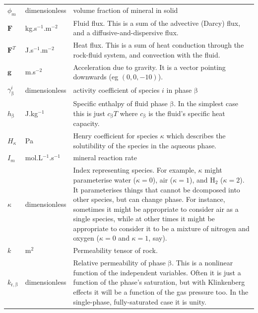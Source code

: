 \documentclass[12pt]{report}
\def\species{\kappa}
\def\phase{\mathrm{\beta}}
\def\flux{\mathbf{F}}
\begin{document}
\begin{longtable}{llp{10cm}}
$\phi_{m}$ & dimensionless & volume fraction of mineral in solid \\

$\flux$ & kg.s$^{-1}$.m$^{-2}$ & Fluid flux.  This is a sum of
the advective (Darcy) flux, and a diffusive-and-dispersive flux. \\

$\flux^{T}$ & J.s$^{-1}$.m$^{-2}$ & Heat flux.  This is a sum of heat
conduction through the rock-fluid system, and convection with the
fluid. \\

${\mathbf g}$ & m.s$^{-2}$ & Acceleration due to gravity.  It is a
vector pointing downwards (eg $(0, 0, -10)$). \\

$\gamma_{\phase}^{i}$ & dimensionless & activity coefficient of
species $i$ in phase $\phase$ \\

$h_{\phase}$ & J.kg$^{-1}$ & Specific enthalpy of fluid phase
$\phase$. In the simplest case this is just $c_{\phase}T$ where
$c_{\phase}$ is the fluid's specific heat capacity.\\

$H_{\species}$ & Pa & Henry coefficient for species $\species$ which
describes the solutibility of the species in the aqueous phase. \\

$I_{m}$ & mol.L$^{-1}$.s$^{-1}$ & mineral reaction rate \\

$\species$ & dimensionless & Index representing species.  For example, $\species$
might parameterise water ($\species=0$), air ($\species=1$), and H$_{2}$ ($\species=2$).  It
parameterises things that cannot be dcomposed into other species, but
can change phase.  For instance, sometimes it might be appropriate to
consider air as a single species, while at other times it might be
appropriate to consider it to be a mixture of nitrogen and oxygen
($\species=0$ and $\species=1$, say). \\

$k$ & m$^{2}$ & Permeability tensor of rock. \\

$k_{\mathrm{r,}\phase}$ & dimensionless & Relative permeability of phase $\phase$.
This is a nonlinear function of the independent variables.  Often it
is just a function of the phase's saturation, but with Klinkenberg
effects it will be a function of the gas pressure too.  In the
single-phase, fully-saturated case it is unity.  \\


\end{longtable}
\end{document}

